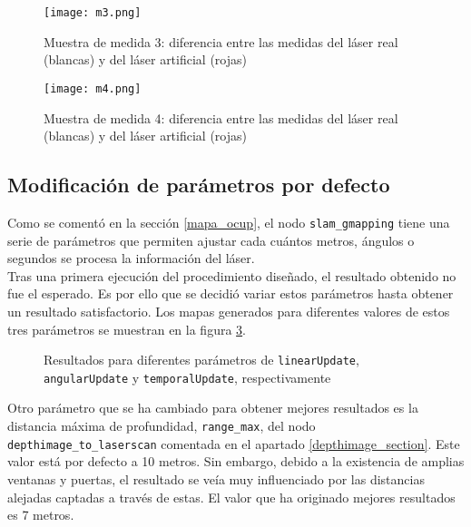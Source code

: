 \begin{figure}[H]
	\begin{center} 
		\texttt{[image: m3.png]}
	\end{center}
	\caption{Muestra de medida 3: diferencia entre las medidas del láser real (blancas) y del láser artificial (rojas)}
	\label{fig:m3}
\end{figure}

\begin{figure}[H]
	\begin{center} 
		\texttt{[image: m4.png]}
	\end{center}
	\caption{Muestra de medida 4: diferencia entre las medidas del láser real (blancas) y del láser artificial (rojas)}
	\label{fig:m4}
\end{figure}

\subsection{Modificación de parámetros por defecto}

Como se comentó en la sección \ref{mapa_ocup}, el nodo \texttt{slam\_gmapping} tiene una serie de parámetros que permiten ajustar cada cuántos metros, ángulos o segundos se procesa la información del láser.\\

Tras una primera ejecución del procedimiento diseñado, el resultado obtenido no fue el esperado. Es por ello que se decidió variar estos parámetros hasta obtener un resultado satisfactorio. Los mapas generados para diferentes valores de estos tres parámetros se muestran en la figura \ref{fig:scans_params}.\\

\begin{figure}[H]
 \centering
 \caption{Resultados para diferentes parámetros de \texttt{linearUpdate}, \texttt{angularUpdate} y \texttt{temporalUpdate}, respectivamente}
 \label{fig:scans_params}
\end{figure}

Otro parámetro que se ha cambiado para obtener mejores resultados es la distancia máxima de profundidad, \texttt{range\_max}, del nodo \texttt{depthimage\_to\_laserscan} comentada en el apartado \ref{depthimage_section}. Este valor está por defecto a 10 metros. Sin embargo, debido a la existencia de amplias ventanas y puertas, el resultado se veía muy influenciado por las distancias alejadas captadas a través de estas. El valor que ha originado mejores resultados es 7 metros.\\

